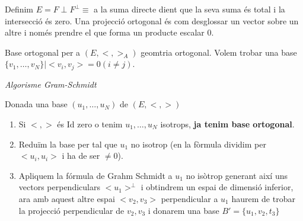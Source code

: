 \documentclass[12pt]{article}
\begin{document}
Definim $E = F \perp F^{\perp} \equiv$ a la suma directe dient que la seva suma és total i la intersecció és zero. Una projecció ortogonal és com desglossar un vector sobre un altre i només prendre el que forma un producte escalar  $0$.

\begin{center}
\end{center}

Base ortogonal per a $(E,<,>_A)$ geomtria ortogonal. Volem trobar una base $\{v_1, \dots, v_N\} \mid <v_i,v_j> = 0 (i\neq j)$. 

\noindent \textit{Algorisme Gram-Schmidt}

Donada una base $(u_1, \dots, u_N)$ de $(E, <,>)$

\begin{enumerate}
    \item Si $<,>$ és Id zero o tenim $u_1,\dots, u_N$ isotrops, \textbf{ja tenim base ortogonal}.
    \item Reduïm la base per tal que $u_1$ no isotrop (en la fòrmula dividim per $<u_i, u_i>$ i ha de ser $\neq 0$).
    \item Apliquem la fórmula de Grahm Schmidt a $u_1$ no isòtrop generant així uns vectors perpendiculars $<u_1>^{\perp}$ i obtindrem un espai de dimensió inferior, ara amb aquest altre espai $<v_2,v_3>$ perpendicular a $u_1$ haurem de trobar la projecció perpendicular de $v_2, v_3$ i donarem una base $B' = \{u_1, v_2 , t_3\}$
\end{enumerate}
\end{document}
